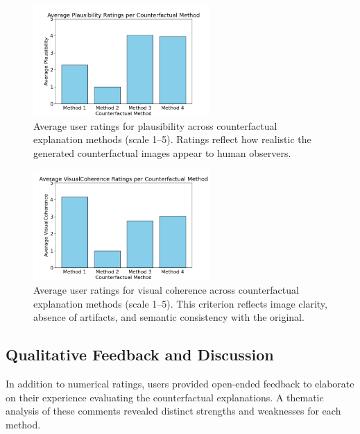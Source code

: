 \begin{figure}[h]
    \centering
    \includegraphics[width=0.6\textwidth]{img/human_rating_results/Plausibility_ratings.png}
    \caption[User-rated plausibility scores by method]{%
Average user ratings for plausibility across counterfactual explanation methods (scale 1–5). Ratings reflect how realistic the generated counterfactual images appear to human observers.}
    \label{fig:cf_plausibility}
\end{figure}

\begin{figure}[h]
    \centering
    \includegraphics[width=0.6\textwidth]{img/human_rating_results/VisualCoherence_ratings.png}
    \caption[User-rated visual coherence scores by method]{%
Average user ratings for visual coherence across counterfactual explanation methods (scale 1–5). This criterion reflects image clarity, absence of artifacts, and semantic consistency with the original.}
    \label{fig:cf_visualcoherence}
\end{figure}

\vspace{0.5em}
\subsection{Qualitative Feedback and Discussion}

In addition to numerical ratings, users provided open-ended feedback to elaborate on their experience evaluating the counterfactual explanations. A thematic analysis of these comments revealed distinct strengths and weaknesses for each method.

